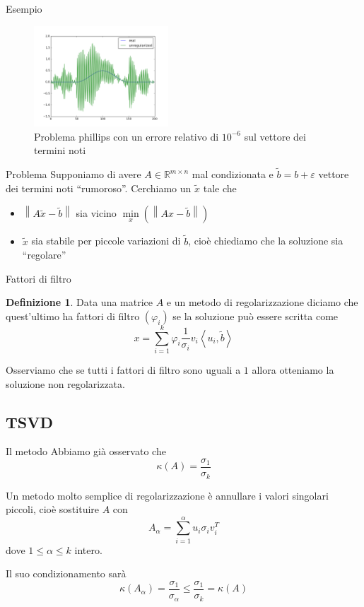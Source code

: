 \documentclass{beamer}
\newcounter{counter1}
\theoremstyle{plain}
\theoremstyle{definition}
\newtheorem{mydef}[counter1]{Definizione}
\theoremstyle{remark}
\newcommand{\pa}[1]{\left(#1\right)}
\newcommand{\ang}[1]{\left<#1\right>}
\newcommand{\norm}[1]{\left\|#1\right\|}
\begin{document}
\begin{frame}{Esempio}
  \begin{figure}
    \centering
    \includegraphics[keepaspectratio,width=190px]{phillips_unreg_-6.png}
    \caption{Problema phillips con un errore relativo di $10^{-6}$ sul
      vettore dei termini noti}
  \end{figure}
\end{frame}


\begin{frame}{Problema}
  Supponiamo di avere $A\in \mathbb{R}^{m \times n}$ mal condizionata
  e $\tilde b = b + \varepsilon$ vettore dei termini noti
  ``rumoroso''. Cerchiamo un $\tilde x$ tale che
  \begin{itemize}
  \item $\norm{A\tilde x-\tilde b}$ sia vicino $\min \limits_x
    \pa{\norm{A x - \tilde b}}$
  \item $\tilde x$ sia stabile per piccole variazioni di $\tilde b$,
    cioè chiediamo che la soluzione sia ``regolare''
  \end{itemize}
\end{frame}

\begin{frame}{Fattori di filtro}
  \begin{mydef}
    Data una matrice $A$ e un metodo di regolarizzazione diciamo che
    quest'ultimo ha fattori di filtro $\pa{\varphi _i}$ se la
    soluzione può essere scritta come
    \[ x = \sum _{i=1} ^k \varphi _i \frac{1}{\sigma _i} v_i
    \ang{u_i,\tilde b} \]
  \end{mydef}

  Osserviamo che se tutti i fattori di filtro sono uguali a $1$ allora
  otteniamo la soluzione non regolarizzata.
\end{frame}

\subsection{TSVD}

\begin{frame}{Il metodo}
  Abbiamo già osservato che
  \[ \kappa (A) = \frac{\sigma _1}{\sigma _k} \]
  
  Un metodo molto semplice di regolarizzazione è annullare i valori
  singolari piccoli, cioè sostituire $A$ con
  \[ A_\alpha = \sum _{i=1} ^\alpha u_i \sigma _i v_i ^T \]
  dove $1\le \alpha \le k$ intero.
  \vfill
  
  Il suo condizionamento sarà
  \[ \kappa (A_\alpha) = \frac{\sigma _1}{\sigma _\alpha} \le
  \frac{\sigma _1}{\sigma _k} = \kappa(A) \]
\end{frame}
\end{document}
